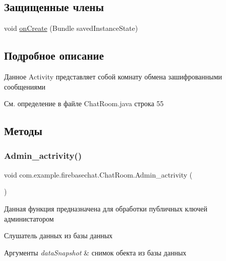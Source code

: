 \subsection*{Защищенные члены}
\begin{DoxyCompactItemize}
\item 
void \mbox{\hyperlink{classcom_1_1example_1_1firebasechat_1_1_chat_room_a5eb5c76ba6bdb4aa636bf1bd26364a02}{on\+Create}} (Bundle saved\+Instance\+State)
\end{DoxyCompactItemize}


\subsection{Подробное описание}
Данное Activity представляет собой комнату обмена зашифрованными сообщениями 

См. определение в файле Chat\+Room.\+java строка 55



\subsection{Методы}
\mbox{\label{classcom_1_1example_1_1firebasechat_1_1_chat_room_a2772aea181483bc52c5fdffcf7fb9f79}} 
\subsubsection{\texorpdfstring{Admin\+\_\+actrivity()}{Admin\_actrivity()}}
{\footnotesize\ttfamily void com.\+example.\+firebasechat.\+Chat\+Room.\+Admin\+\_\+actrivity (\begin{DoxyParamCaption}{ }\end{DoxyParamCaption})}



Данная функция предназначена для обработки публичных ключей администатором 

Слушатель данных из базы данных 
\begin{DoxyParams}{Аргументы}
{\em data\+Snapshot} & снимок обекта из базы данных\\
\hline
\end{DoxyParams}


